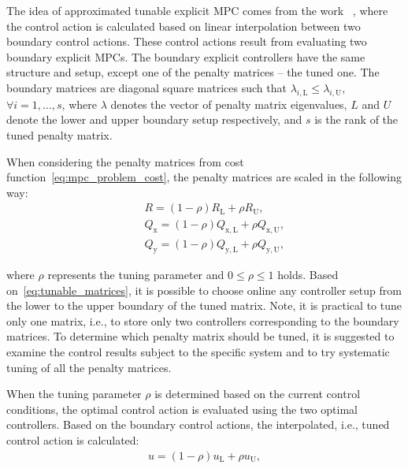 \documentclass[preprint,12pt]{elsarticle}
\begin{document}
The idea of approximated tunable explicit MPC comes from the work ~\cite{Klauco_tunable}, where the control action is calculated based on linear interpolation between two boundary control actions. These control actions result from evaluating two boundary explicit MPCs. The boundary explicit controllers have the same structure and setup, except one of the penalty matrices -- the tuned one. The boundary matrices are diagonal square matrices such that $\lambda_{i,\mathrm{L}} \le \lambda_{i,\mathrm{U}}$, $\forall i = 1,\dots,s$, where $\lambda$ denotes the vector of penalty matrix eigenvalues, $L$ and $U$ denote the lower and upper boundary setup respectively, and $s$ is the rank of the tuned penalty matrix.

When considering the penalty matrices from cost function~\eqref{eq:mpc_problem_cost}, the penalty matrices are scaled in the following way:
\begin{subequations}
	\label{eq:tunable_matrices}
	\begin{eqnarray}
		\label{eq:tunable_R}
		&~& R = (1-\rho)R_\mathrm{L} + \rho R_\mathrm{U}, \\
		\label{eq:tunable_Qx}
		&~& Q_\mathrm{x} = (1-\rho)Q_\mathrm{x,L} + \rho Q_\mathrm{x,U}, \\
		\label{eq:tunable_Qy}
		&~& Q_\mathrm{y} = (1-\rho)Q_\mathrm{y,L} + \rho Q_\mathrm{y,U},
	\end{eqnarray}
\end{subequations}

where $\rho$ represents the tuning parameter and $0 \le \rho \le 1$ holds. Based on~\eqref{eq:tunable_matrices}, it is possible to choose online any controller setup from the lower to the upper boundary of the tuned matrix. Note, it is practical to tune only one matrix, i.e., to store only two controllers corresponding to the boundary matrices. To determine which penalty matrix should be tuned, it is suggested to examine the control results subject to the specific system and to try systematic tuning of all the penalty matrices.

When the tuning parameter $\rho$ is determined based on the current control conditions, the optimal control action is evaluated using the two optimal controllers. Based on the boundary control actions, the interpolated, i.e., tuned control action is calculated:
\begin{subequations}
	\begin{eqnarray}
		\label{eq:tunable_u}
		u = (1-\rho)u_\mathrm{L} + \rho u_\mathrm{U},
	\end{eqnarray}
\end{subequations}
\end{document}
